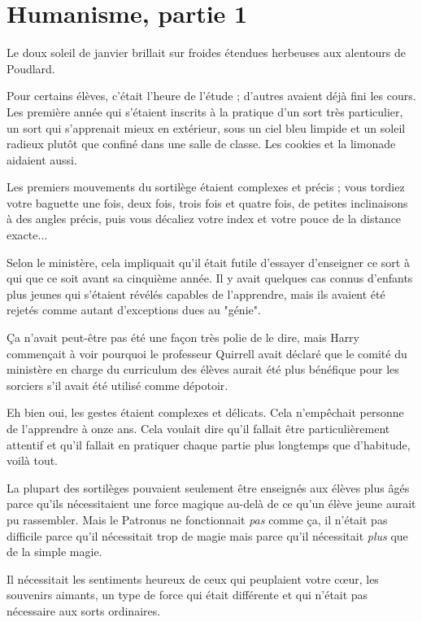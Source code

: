 
\chapter{Humanisme, partie 1}

Le doux soleil de janvier brillait sur froides étendues herbeuses aux alentours de Poudlard.

Pour certains élèves, c'était l'heure de l'étude ; d'autres avaient déjà fini les cours. Les première année qui s'étaient inscrits à la pratique d'un sort très particulier, un sort qui s'apprenait mieux en extérieur, sous un ciel bleu limpide et un soleil radieux plutôt que confiné dans une salle de classe. Les cookies et la limonade aidaient aussi.

Les premiers mouvements du sortilège étaient complexes et précis ; vous tordiez votre baguette une fois, deux fois, trois fois et quatre fois, de petites inclinaisons à des angles précis, puis vous décaliez votre index et votre pouce de la distance exacte...

Selon le ministère, cela impliquait qu'il était futile d'essayer d'enseigner ce sort à qui que ce soit avant sa cinquième année. Il y avait quelques cas connus d'enfants plus jeunes qui s'étaient révélés capables de l'apprendre, mais ils avaient été rejetés comme autant d'exceptions dues au "génie".

Ça n'avait peut-être pas été une façon très polie de le dire, mais Harry commençait à voir pourquoi le professeur Quirrell avait déclaré que le comité du ministère en charge du curriculum des élèves aurait été plus bénéfique pour les sorciers s'il avait été utilisé comme dépotoir.

Eh bien oui, les gestes étaient complexes et délicats. Cela n'empêchait personne de l'apprendre à onze ans. Cela voulait dire qu'il fallait être particulièrement attentif et qu'il fallait en pratiquer chaque partie plus longtemps que d'habitude, voilà tout.

La plupart des sortilèges pouvaient seulement être enseignés aux élèves plus âgés parce qu'ils nécessitaient une force magique au-delà de ce qu'un élève jeune aurait pu rassembler. Mais le Patronus ne fonctionnait \emph{pas}  comme ça, il n'était pas difficile parce qu'il nécessitait trop de magie mais parce qu'il nécessitait \emph{plus}  que de la simple magie.

Il nécessitait les sentiments heureux de ceux qui peuplaient votre cœur, les souvenirs aimants, un type de force qui était différente et qui n'était pas nécessaire aux sorts ordinaires.

